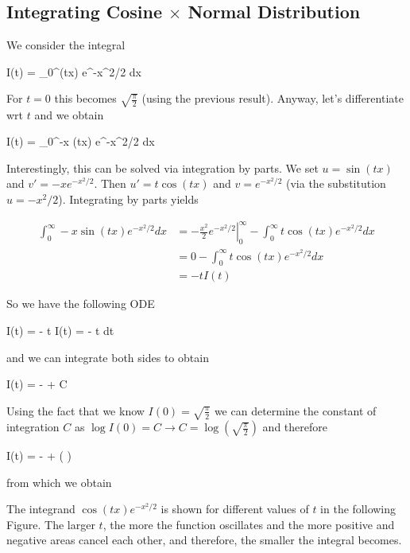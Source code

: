 \subsection{Integrating Cosine $\times$ Normal Distribution}

We consider the integral

\bee
I(t) = \int_0^\infty \cos(tx) e^{-x^2/2} dx
\eee

For $t=0$ this becomes $\sqrt{\frac{\pi}{2}}$ (using the previous result). Anyway, let's differentiate wrt $t$ and we obtain

\bee
{} I(t) = \int_0^\infty -x \sin(tx) e^{-x^2/2} dx
\eee

Interestingly, this can be solved via integration by parts. We set $u = \sin(tx)$ and $v' = -x e^{-x^2/2}$. Then $u' = t \cos(tx)$ and $v = e^{-x^2/2}$ (via the substitution $u = -x^2 / 2$). Integrating by parts yields

\begin{align*}
    \int_0^\infty -x \sin(tx) e^{-x^2/2} dx &= - \left. \frac{x^2}{2} e^{-x^2/2} \right|_0^\infty - \int_0^\infty t \cos(tx) e^{-x^2/2} dx \\ &= 0 - \int_0^\infty t \cos(tx) e^{-x^2/2} dx \\ &= - t I(t)
\end{align*}

So we have the following ODE

\bee
{} I(t) = - t I(t) \rightarrow {} = - t dt
\eee

and we can integrate both sides to obtain

\bee
\log I(t) = -  + C
\eee

Using the fact that we know $I(0) = \sqrt{\frac{\pi}{2}}$ we can determine the constant of integration $C$ as $\log I(0) = C \rightarrow C = \log(\sqrt{ \frac{\pi}{2} })$ and therefore

\bee
\log I(t) = -  + \log\left(  \right)
\eee

from which we obtain

\bee
{}
\eee

The integrand $\cos(tx) e^{-x^2/2}$ is shown for different values of $t$ in the following Figure. The larger $t$, the more the function oscillates and the more positive and negative areas cancel each other, and therefore, the smaller the integral becomes.

